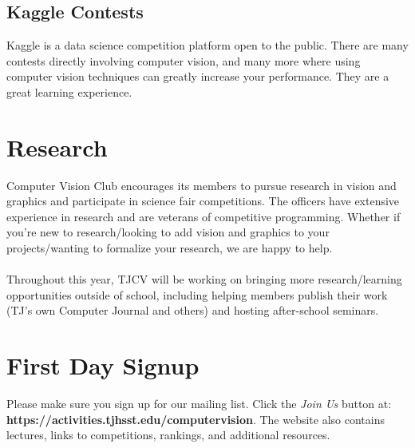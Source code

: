\documentclass{article}
\begin{document}
\subsection{Kaggle Contests}
Kaggle is a data science competition platform open to the public. There are many contests directly involving computer vision, and many more where using computer vision techniques can greatly increase your performance. They are a great learning experience.

\section{Research}
Computer Vision Club encourages its members to pursue research in vision and graphics and participate in science fair competitions. The officers have extensive experience in research and are veterans of competitive programming. Whether if you're new to research/looking to add vision and graphics to your projects/wanting to formalize your research, we are happy to help.
\\ \\
Throughout this year, TJCV will be working on bringing more research/learning opportunities outside of school, including helping members publish their work (TJ's own Computer Journal and others) and hosting after-school seminars. 

\section{First Day Signup}
Please make sure you sign up for our mailing list. Click the \textit{Join Us} button at: \\ \textbf{https://activities.tjhsst.edu/computervision}. The website also contains lectures, links to competitions, rankings, and additional resources.  

      
\end{document}
